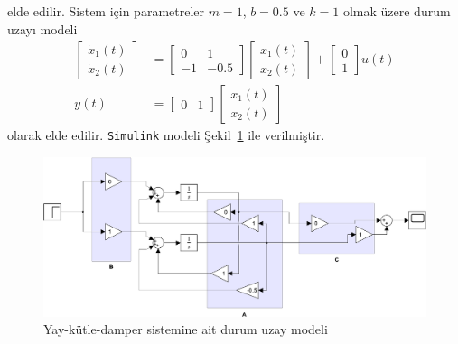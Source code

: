 elde edilir. Sistem için parametreler $m=1$, $b=0.5$ ve $k=1$ olmak üzere durum uzayı modeli
\begin{equation}
\begin{split}
    \begin{bmatrix}
        \dot{x}_1(t)\\
        \dot{x}_2(t)
    \end{bmatrix}&=
    \begin{bmatrix}
        0& 1\\
        -1& -0.5
    \end{bmatrix}\begin{bmatrix}
        x_1(t)\\
        x_2(t)
    \end{bmatrix}+\begin{bmatrix}
        0\\
        1
    \end{bmatrix}u(t)\\
    y(t)&=\begin{bmatrix}
        0& 1
    \end{bmatrix}\begin{bmatrix}
        x_1(t)\\
        x_2(t)
    \end{bmatrix}
\end{split}
\end{equation}
olarak elde edilir. \verb|Simulink| modeli Şekil~\ref{fig:model1} ile verilmiştir.
\begin{figure}[!htb]
    \centering
    \includegraphics[width=\textwidth]{img/model1}
    \caption{Yay-kütle-damper sistemine ait durum uzay modeli}
    \label{fig:model1}
\end{figure}

